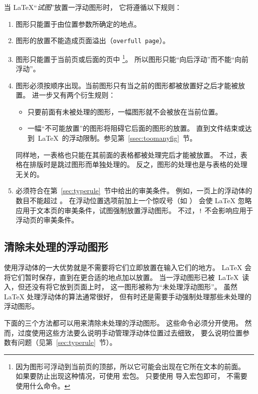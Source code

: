 当 \LaTeX{}“\emph{试图}”放置一浮动图形时，
它将遵循以下规则：
\begin{enumerate}
	\item 图形只能置于由位置参数所确定的地点。
	\item 图形的放置不能造成页面溢出（\texttt{overfull page}）。
	\item 图形只能置于当前页或后面的页中
		\footnote{因为图形可浮动到当前页的顶部，所以它可能会出现在它所在文本的前面。
			如果要防止出现这种情况，可使用 宏包。
			只要使用  导入宏包即可，
			不需要使用什么命令。}。
	所以图形只能“向后浮动”而不能“向前浮动”。
	\item 图形必须按顺序出现。当前图形只有当之前的图形都被放置好之后才能被放置。
	进一步又有两个衍生规则：
	\begin{itemize}
		\item 只要前面有未被处理的图形，一幅图形就不会被放在当前位置。
		\item 一幅“不可能放置”的图形将阻碍它后面的图形的放置。
		直到文件结束或达到~\LaTeX{}~的浮动限制。参见第~\ref{ssec:toomanyfig}~节。
	\end{itemize}
	同样地，一表格也只能在其前面的表格都被处理完后才能被放置。
	不过，表格在排版时是跳过图形而单独处理的。
	反之，图形的处理也是与表格的处理无关的。
	\item 必须符合在第~\ref{sec:typerule}~节中给出的审美条件。
	例如，一页上的浮动体的数目不能超过 。
	在浮动位置选项前加上一个惊叹号（如 \opt{[!ht]}）
	会使 \LaTeX{} 忽略应用于文本页的审美条件，试图强制放置浮动图形。
	不过，\texttt{!} 不会影响应用于浮动页的审美条件。
\end{enumerate}


\subsection{清除未处理的浮动图形}\label{ssec:unprocessfig}

使用浮动体的一大优势就是不需要将它们立即放置在输入它们的地方。
\LaTeX{} 会将它们暂时保存，直到在更合适的地点加以放置。
当一浮动图形已被~\LaTeX{}~读入，但还没有将它放到页面上时，
这一图形被称为“未处理浮动图形”。
虽然 \LaTeX{} 处理浮动体的算法通常很好，
但有时还是需要手动强制处理那些未处理的浮动图形。

下面的三个方法都可以用来清除未处理的浮动图形。
这些命令必须分开使用。
然而，过度使用这些方法要么说明手动管理浮动体位置过去细致，
要么说明位置参数有问题（见第~\ref{sec:typerule}~节）。

